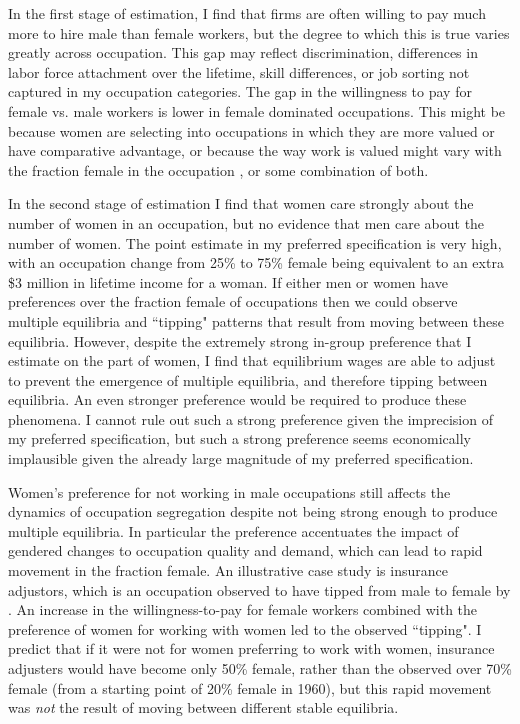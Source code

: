 \documentclass[11pt]{article}
\begin{document}
In the first stage of estimation, I find that firms are often willing to pay much more to hire male than female workers, but the degree to which this is true varies greatly across occupation. This gap may reflect discrimination, differences in labor force attachment over the lifetime, skill differences, or job sorting not captured in my occupation categories. The gap in the willingness to pay for female vs. male workers is lower in female dominated occupations. This might be because women are selecting into occupations in which they are more valued or have comparative advantage, or because the way work is valued might vary with the fraction female in the occupation \cite{Levanon2009, Harris2018}, or some combination of both.


In the second stage of estimation I find that women care strongly about the number of women in an occupation, but no evidence that men care about the number of women.  The point estimate in my preferred specification is very high, with an occupation change from 25\% to 75\% female being equivalent to an extra \$3 million in lifetime income for a woman. If either men or women have preferences over the fraction female of occupations then we could observe multiple equilibria and ``tipping" patterns that result from moving between these equilibria. However, despite the extremely strong in-group preference that I estimate on the part of women, I find that equilibrium wages are able to adjust to prevent the emergence of multiple equilibria, and therefore tipping between equilibria. An even stronger preference would be required to produce these phenomena. I cannot rule out such a strong preference given the imprecision of my preferred specification, but such a strong preference seems economically implausible given the already large magnitude of my preferred specification.


Women's preference for not working in male occupations still affects the dynamics of occupation segregation despite not being strong enough to produce multiple equilibria. In particular the preference accentuates the impact of gendered changes to occupation quality and demand, which can lead to rapid movement in the fraction female. An illustrative case study is insurance adjustors, which is an occupation observed to have tipped from male to female by . An increase in the willingness-to-pay for female workers combined with the preference of women for working with women led to the observed ``tipping".  I predict that if it were not for women preferring to work with women, insurance adjusters would have become only 50\% female, rather than the observed over 70\% female (from a starting point of 20\% female in 1960), but this rapid movement was \textit{not} the result of moving between different stable equilibria. 
\end{document}
